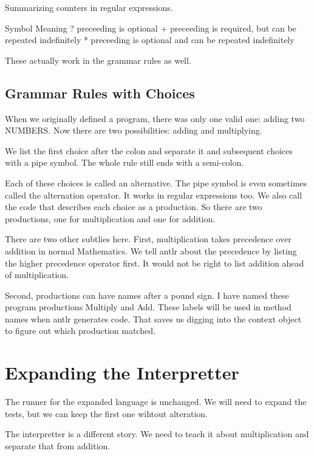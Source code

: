 Summarizing counters in regular expressions.

    Symbol      Meaning
    ?           preceeding is optional
    +           preceeding is required, but can be repeated indefinitely
    *           preceeding is optional and can be repeated indefinitely

These actually work in the grammar rules as well.

\subsection{Grammar Rules with Choices}

When we originally defined a program, there was only one valid one:
adding two NUMBERS. Now there are two possibilities: adding and multiplying.

We list the first choice after the colon and separate it and subsequent
choices with a pipe symbol. The whole rule still ends with a semi-colon.

Each of these choices is called an alternative. The pipe symbol is
even sometimes called the alternation operator. It works in regular
expressions too. We also call the code that describes each choice as
a production. So there are two productions, one for multiplication
and one for addition.

There are two other subtlies here. First, multiplication takes precedence
over addition in normal Mathematics. We tell antlr about the precedence
by listing the higher precedence operator first. It would not be right
to list addition ahead of multiplication.

Second, productions can have names after a pound sign. I have named
these program productions Multiply and Add. These labels will be used
in method names when antlr generates code. That saves us digging into
the context object to figure out which production matched.

\section{Expanding the Interpretter}

The runner for the expanded language is unchanged. We will need to expand
the tests, but we can keep the first one wihtout alteration.

The interpretter is a different story. We need to teach it about
multiplication and separate that from addition.

